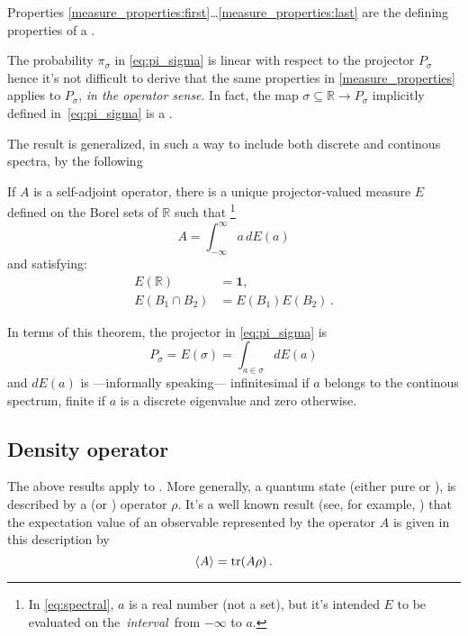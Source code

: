 \begin{remark}
  Properties \ref{measure_properties:first}\dots\ref{measure_properties:last}
  are the defining properties of a  \cite{EncMath_Measure}.
\end{remark}

The probability $\pi_{\sigma}$ in \eqref{eq:pi_sigma} is linear with respect to the projector
$P_{\sigma}$ hence it's not difficult to derive that the same properties in
\autoref{measure_properties} applies to $P_{\sigma}$, \emph{in the operator sense}.
In fact, the map $\sigma \subseteq \mathbb{R} \rightarrow P_{\sigma}$
implicitly defined in~\eqref{eq:pi_sigma} is a .

The result is generalized,
in such a way to include both discrete and continous spectra,
by the following \cite{VonNeumann, Ballentine}
\begin{theorem}
  If $A$ is a self-adjoint operator,
  there is a unique projector-valued measure $E$
  defined on the Borel sets of $\mathbb{R}$
  such that
  \footnote{
    In \eqref{eq:spectral}, $a$ is a real number (not a set),
    but it's intended $E$ to be evaluated
    on the~\emph{interval}~from $-\infty$ to $a$.
  }
  \begin{equation}\label{eq:spectral}
    A=\int_{-\infty}^{\infty}a\, dE(a)
  \end{equation}
  and satisfying:
  \begin{align*}
    E(\mathbb{R})       & =\mathbf{1},\\
    E(B_{1}\cap B_{2}) & =E(B_{1})E(B_{2})\,.
  \end{align*}
\end{theorem}

In terms of this theorem, the projector in \eqref{eq:pi_sigma} is
\begin{equation}\label{eq:P_sigma_spectral}
  P_{\sigma} = E(\sigma) = \int_{a\in\sigma}dE(a)
\end{equation}
and $dE(a)$ is
---informally speaking---
infinitesimal if $a$ belongs to the continous spectrum,
finite if $a$ is a discrete eigenvalue
and zero otherwise.

\subsection{Density operator}

The above results apply to .
More generally, a quantum state (either pure or ),
is described by a  (or ) operator $\rho$.
It's a well known result (see, for example, \cite{open_systems})
that the expectation value of an observable represented by the operator $A$
is given in this description by
\begin{equation}\label{eq:expvalA_rho}
  \expval{A} = \tr(A\rho)\,.
\end{equation}

